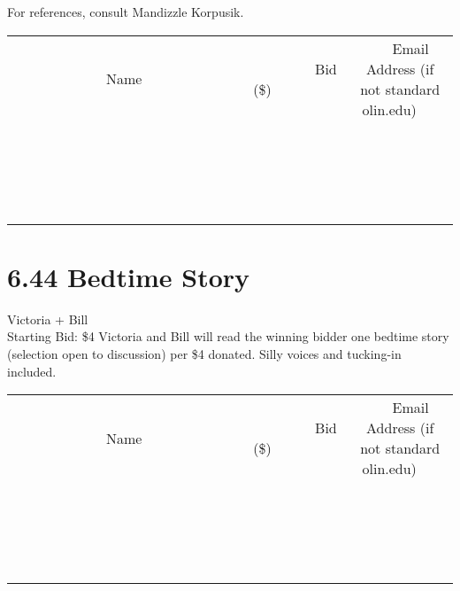 \documentclass[11pt]{article}
\begin{document}
For references, consult Mandizzle Korpusik.
\\[3ex]
\begin{tabular}{c c c}
~~~~~~~~~~~~~Name~~~~~~~~~~~~~ & ~~~~~~~~~Bid (\$)~~~~~~~~~  & ~~~Email Address (if not standard olin.edu)~~~\\
 & & \\
\hline
 & & \\
\hline
 & & \\
\hline
 & & \\
\hline
 & & \\
\hline
 & & \\
\hline
 & & \\
\hline
 & & \\
\hline
 & & \\
\hline
 & & \\
\hline
 & & \\
\hline
 & & \\
\hline
 & & \\
\hline
 & & \\
\hline
 & & \\
\hline
 & & \\
\hline
 & & \\
\hline
 & & \\
\hline
 & & \\
\hline
\end{tabular}
\newpage
\section*{6.44 Bedtime Story}
Victoria + Bill
\\
Starting Bid: \$4
\newline
Victoria and Bill will read the winning bidder one bedtime story (selection open to discussion) per \$4 donated. Silly voices and tucking-in included.
\\[3ex]
\begin{tabular}{c c c}
~~~~~~~~~~~~~Name~~~~~~~~~~~~~ & ~~~~~~~~~Bid (\$)~~~~~~~~~  & ~~~Email Address (if not standard olin.edu)~~~\\
 & & \\
\hline
 & & \\
\hline
 & & \\
\hline
 & & \\
\hline
 & & \\
\hline
 & & \\
\hline
 & & \\
\hline
 & & \\
\hline
 & & \\
\hline
 & & \\
\hline
 & & \\
\hline
 & & \\
\hline
 & & \\
\hline
 & & \\
\hline
 & & \\
\hline
 & & \\
\hline
 & & \\
\hline
 & & \\
\hline
 & & \\
\hline
\end{tabular}
\newpage
\end{document}
